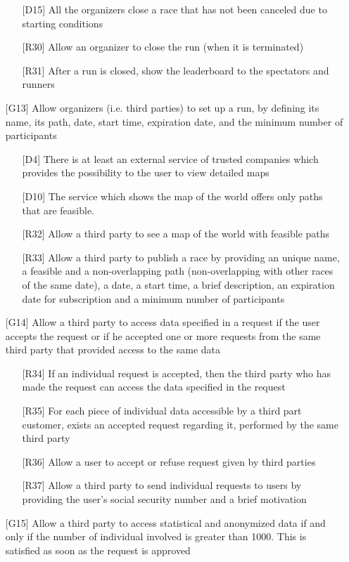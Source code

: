 \begin{itemize}
\begin{itemize}
	\item[{[D15]}]All the organizers close a race that has not been canceled due to starting conditions
	\item[{[R30]}] Allow an organizer to close the run (when it is terminated)
	\item[{[R31]}] After a run is closed, show the leaderboard to the spectators and runners
	\end{itemize}
\item[{[G13]}] Allow organizers (i.e. third parties) to set up a run, by defining its name, its path, date, start time, expiration date, and the minimum number of participants
	\begin{itemize}
	\item[{[D4]}] There is at least an external service of trusted companies which provides the possibility to the user to view detailed maps
	\item[{[D10]}] The service which shows the map of the world offers only paths that are feasible.
	\item[{[R32]}] Allow a third party to see a map of the world with feasible paths
	\item[{[R33]}] Allow a third party to publish a race by providing an unique name, a feasible and a non-overlapping path (non-overlapping with other races of the same date), a date, a start time, a brief description, an expiration date for subscription and a minimum number of participants
	\end{itemize}
\item[{[G14]}] Allow a third party to access data specified in a request if the user accepts the request or if he accepted one or more requests from the same third party that provided access to the same data 
	\begin{itemize}
	\item[{[R34]}] If an individual request is accepted, then the third party who has made the request can access the data specified in the request
	\item[{[R35]}] For each piece of individual data accessible by a third part customer, exists an accepted request regarding it, performed by the same third party 
	\item[{[R36]}] Allow a user to accept or refuse request given by third parties
	\item[{[R37]}] Allow a third party to send individual requests to users by providing the user's social security number and a brief motivation
	\end{itemize}
\item[{[G15]}] Allow a third party to access statistical and anonymized data if and only if the number of individual involved is greater than 1000. This is satisfied as soon as the request is approved  

\end{itemize}
